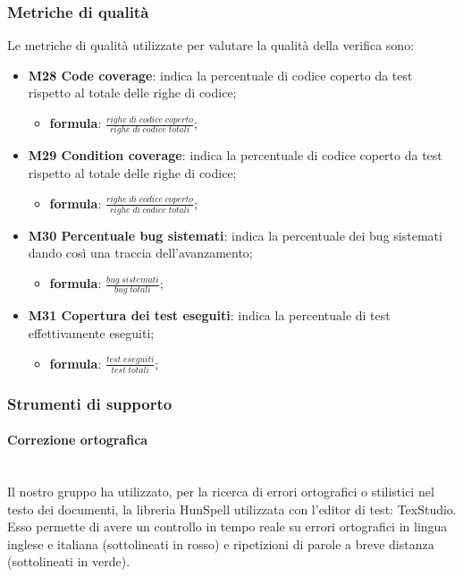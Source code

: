 \subsubsection{Metriche di qualità}
Le metriche di qualità utilizzate per valutare la qualità della verifica sono:
\begin{itemize}
	\item \textbf{M28 Code coverage}: indica la percentuale di codice coperto da test rispetto al totale delle righe di codice;
	\begin{itemize}
		\item[] \textbf{formula}: $\frac{righe \; di \; codice \; coperto}{righe \; di \; codice \; totali}$;
	\end{itemize} 

	\item \textbf{M29 Condition coverage}: indica la percentuale di codice coperto da test rispetto al totale delle righe di codice;
	\begin{itemize}
		\item[] \textbf{formula}: $\frac{righe \; di \; codice \; coperto}{righe \; di \; codice \; totali}$;
	\end{itemize} 

	\item \textbf{M30 Percentuale bug sistemati}: indica la percentuale dei bug sistemati dando così una traccia dell'avanzamento;
	\begin{itemize}
		\item[] \textbf{formula}: $\frac{bug \; sistemati}{bug \; totali}$;
	\end{itemize} 

	\item \textbf{M31 Copertura dei test eseguiti}: indica la percentuale di test effettivamente eseguiti;
	\begin{itemize}
		\item[] \textbf{formula}: $\frac{test \; eseguiti}{test \; totali}$;
	\end{itemize} 

\end{itemize}
\subsubsection{Strumenti di supporto}
	\paragraph{Correzione ortografica}\mbox{}\\ [1mm]
	Il nostro gruppo ha utilizzato, per la ricerca di errori ortografici o stilistici nel testo dei documenti, la libreria HunSpell utilizzata con l'editor di test: TexStudio. Esso permette di avere un controllo in tempo reale su errori ortografici in lingua inglese e italiana (sottolineati in rosso) e ripetizioni di parole a breve distanza (sottolineati in verde).
